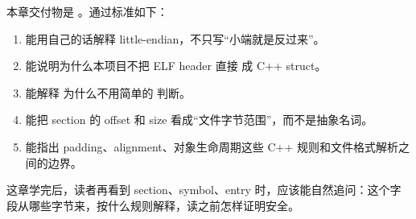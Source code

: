 
本章交付物是 。通过标准如下：

\begin{enumerate}
  \item 能用自己的话解释 little-endian，不只写“小端就是反过来”。
  \item 能说明为什么本项目不把 ELF header 直接  成 C++ struct。
  \item 能解释  为什么不用简单的  判断。
  \item 能把 section 的 offset 和 size 看成“文件字节范围”，而不是抽象名词。
  \item 能指出 padding、alignment、对象生命周期这些 C++ 规则和文件格式解析之间的边界。
\end{enumerate}

这章学完后，读者再看到 section、symbol、entry 时，应该能自然追问：这个字段从哪些字节来，按什么规则解释，读之前怎样证明安全。
